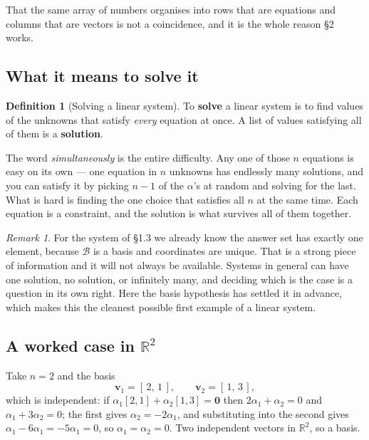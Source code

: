 \documentclass[11pt]{article}
\theoremstyle{plain}
\theoremstyle{definition}
\newtheorem{defn}{Definition}[section]
\theoremstyle{remark}
\newtheorem*{rmk}{Remark}
\newcommand{\R}{\mathbb{R}}
\newcommand{\vc}[1]{\mathbf{#1}}        %
\newcommand{\bas}{\mathcal{B}}
\begin{document}
\noindent That the same array of numbers organises into rows that are equations
and columns that are vectors is not a coincidence, and it is the whole reason
\S2 works.

\subsection{What it means to solve it}
\begin{defn}[Solving a linear system]
To \textbf{solve} a linear system is to find values of the unknowns that satisfy
\emph{every} equation at once. A list of values satisfying all of them is a
\textbf{solution}.
\end{defn}

\noindent The word \emph{simultaneously} is the entire difficulty. Any one of
those $n$ equations is easy on its own --- one equation in $n$ unknowns has
endlessly many solutions, and you can satisfy it by picking $n-1$ of the
$\alpha$'s at random and solving for the last. What is hard is finding the one
choice that satisfies all $n$ at the same time. Each equation is a constraint,
and the solution is what survives all of them together.

\begin{rmk}
For the system of \S1.3 we already know the answer set has exactly one element,
because $\bas$ is a basis and coordinates are unique. That is a strong piece of
information and it will not always be available. Systems in general can have one
solution, no solution, or infinitely many, and deciding which is the case is a
question in its own right. Here the basis hypothesis has settled it in advance,
which makes this the cleanest possible first example of a linear system.
\end{rmk}

\subsection{A worked case in \texorpdfstring{$\R^{2}$}{R2}}
Take $n=2$ and the basis
\[
  \vc{v}_1 = [\,2,\,1\,], \qquad \vc{v}_2 = [\,1,\,3\,] ,
\]
which is independent: if $\alpha_1[2,1]+\alpha_2[1,3]=\vc{0}$ then
$2\alpha_1+\alpha_2=0$ and $\alpha_1+3\alpha_2=0$; the first gives
$\alpha_2=-2\alpha_1$, and substituting into the second gives
$\alpha_1-6\alpha_1=-5\alpha_1=0$, so $\alpha_1=\alpha_2=0$. Two independent
vectors in $\R^{2}$, so a basis.
\end{document}
